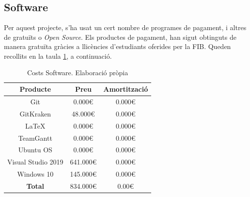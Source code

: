\documentclass[a4paper]{report}
\begin{document}
	\subsection{Software}
	Per aquest projecte, s'ha usat un cert nombre de programes de pagament, i altres de gratuïts o \textit{Open Source}. Els productes de pagament, han sigut obtinguts de manera gratuïta gràcies a llicències d'estudiants oferides per la FIB.
	Queden recollits en la taula \ref{table:softwareCosts}, a continuació.
	\begin{table}%
		\centering
		\begin{tabular}{|| c || c | c||}
			\hline
			\textbf{Producte} & \textbf{Preu} &\textbf{Amortització} \\
			\hline \hline
			Git		 	& 0.000\euro 	& 0.000\euro \\
			GitKraken\footnote	& 48.000\euro   & 0.000\euro \\
			\LaTeX 		& 0.000\euro 	& 0.000\euro \\
			TeamGantt 	& 0.000\euro	& 0.000\euro \\
			Ubuntu OS 	& 0.000\euro  	& 0.000\euro \\
			Visual Studio 2019\footnote& 641.000\euro & 0.000\euro \\
			Windows 10\footnote[2] 	& 145.000\euro 	& 0.000\euro \\
			\hline \hline
			\textbf{Total} & 834.000\euro & 0.00\euro \\
			\hline
		\end{tabular}
		\caption[Costs Software]{Costs Software. Elaboració pròpia}
		\label{table:softwareCosts}
	\end{table}
	
\end{document}
